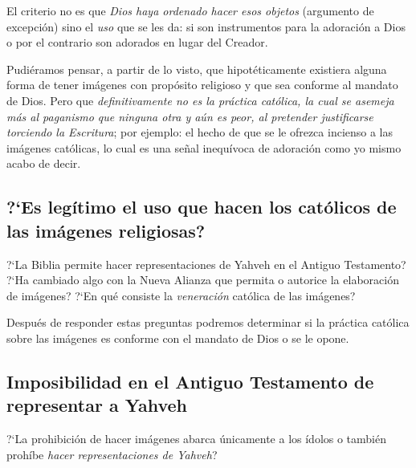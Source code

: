 \documentclass{article}
\begin{document}
El criterio no es que \emph{Dios haya ordenado hacer esos objetos} (argumento de excepci\'on) sino el \emph{uso} que se les da: si son instrumentos para la adoraci\'on a Dios o por el contrario son adorados en lugar del Creador.

Pudi\'eramos pensar, a partir de lo visto, que hipot\'eticamente existiera alguna forma de tener im\'agenes con prop\'osito religioso y que sea conforme al mandato de Dios. Pero que \emph{definitivamente no es la pr\'actica cat\'olica, la cual se asemeja m\'as al paganismo que ninguna otra y a\'un es peor, al pretender justificarse torciendo la Escritura}; por ejemplo: el hecho de que se le ofrezca incienso a las im\'agenes cat\'olicas, lo cual es una se\~nal inequ\'ivoca de adoraci\'on como yo mismo acabo de decir.

\subsection{?`Es leg\'{i}timo el uso que hacen los cat\'olicos de las im\'agenes religiosas?}

?`La Biblia permite hacer representaciones de Yahveh en el Antiguo Testamento? ?`Ha cambiado algo con la Nueva Alianza que permita o autorice la elaboraci\'on de im\'agenes? ?`En qu\'e consiste la \emph{veneraci\'on} cat\'olica de las im\'agenes?

Despu\'es de responder estas preguntas podremos determinar si la pr\'actica cat\'olica sobre las im\'agenes es conforme con el mandato de Dios o se le opone.

\subsection{Imposibilidad en el Antiguo Testamento de representar a Yahveh}

?`La prohibici\'on de hacer im\'agenes abarca \'unicamente a los \'{i}dolos o tambi\'en proh\'{i}be \emph{hacer representaciones de Yahveh}?


\end{document}
